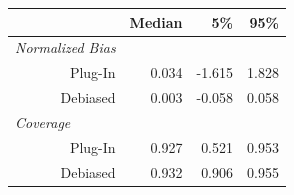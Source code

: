 
\begin{tabular}{r|rrr}
\toprule
  & Median & 5\% & 95\%\\
\midrule
\multicolumn{1}{l|}{\textit{Normalized Bias}}\\
Plug-In & 0.034 & -1.615 & 1.828\\
Debiased & 0.003 & -0.058 & 0.058\\
\midrule
\multicolumn{1}{l|}{\textit{Coverage}}\\
Plug-In & 0.927 & 0.521 & 0.953\\
Debiased & 0.932 & 0.906 & 0.955\\
\bottomrule
\end{tabular}
